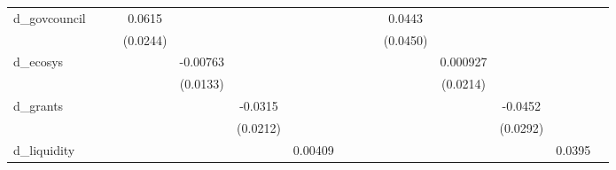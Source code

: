 {\begin{tabular}{l*{14}{c}}
d\_govcouncil        &                     &                     &      0.0615\sym{**} &                     &                     &                     &                     &                     &                     &      0.0443         &                     &                     &                     &                     \\
                    &                     &                     &    (0.0244)         &                     &                     &                     &                     &                     &                     &    (0.0450)         &                     &                     &                     &                     \\
d\_ecosys            &                     &                     &                     &    -0.00763         &                     &                     &                     &                     &                     &                     &    0.000927         &                     &                     &                     \\
                    &                     &                     &                     &    (0.0133)         &                     &                     &                     &                     &                     &                     &    (0.0214)         &                     &                     &                     \\
d\_grants            &                     &                     &                     &                     &     -0.0315         &                     &                     &                     &                     &                     &                     &     -0.0452         &                     &                     \\
                    &                     &                     &                     &                     &    (0.0212)         &                     &                     &                     &                     &                     &                     &    (0.0292)         &                     &                     \\
d\_liquidity         &                     &                     &                     &                     &                     &     0.00409         &                     &                     &                     &                     &                     &                     &      0.0395\sym{*}  &                     \\

\end{tabular}}
